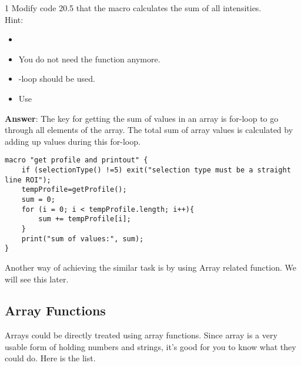 \begin{indentexercise}
{1}
Modify code 20.5 that the macro calculates the sum of all intensities.\\

Hint:

\begin{itemize}
\item
\item You do not need the function anymore. 
\item {}-loop should be used.
\item Use 
\end{itemize}

\item \textbf{Answer}: The key for getting the sum of values in an array is for-loop to go through all elements of the array. The total sum of array values is calculated by adding up values during this for-loop.   
\begin{lstlisting}[numbers=none]
macro "get profile and printout" {
	if (selectionType() !=5) exit("selection type must be a straight line ROI");
	tempProfile=getProfile();
	sum = 0;
	for (i = 0; i < tempProfile.length; i++){
		sum += tempProfile[i];
	}
	print("sum of values:", sum);
}  
\end{lstlisting}

Another way of achieving the similar task is by using Array related function. We will see this later. 
\end{indentexercise}

\subsection{Array Functions}

Arrays could be directly treated using array functions. Since array is a very usable form of holding numbers and strings, it's good for you to know what they could do. Here is the list.

